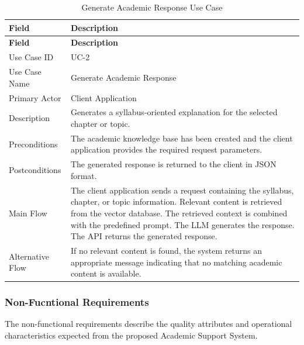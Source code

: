 \begin{xltabular}{\textwidth}{|l|X|}
    \caption{Generate Academic Response Use Case} \\
        \hline
        \textbf{Field} & \textbf{Description} \\
        \hline
        \endfirsthead

        \hline
        \textbf{Field} & \textbf{Description} \\
        \hline
        \endhead

        Use Case ID & UC-2 \\
        \hline
        Use Case Name & Generate Academic Response \\
        \hline
        Primary Actor & Client Application \\
        \hline
        Description & Generates a syllabus-oriented explanation for the selected chapter or topic.\\
        \hline
        Preconditions & The academic knowledge base has been created and the client application provides the required request parameters. \\
        \hline
        Postconditions & The generated response is returned to the client in JSON format. \\
        \hline
        Main Flow &
                The client application sends a request containing the syllabus, chapter, or topic information.\newline
                Relevant content is retrieved from the vector database.\newline
                The retrieved context is combined with the predefined prompt.\newline
                The LLM generates the response.\newline
                The API returns the generated response.
            \\
        \hline
        Alternative Flow & If no relevant content is found, the system returns an appropriate message indicating that no matching academic content is available. \\
        \hline
\end{xltabular}

\subsubsection{Non-Fucntional Requirements}

The non-functional requirements describe the quality attributes and operational characteristics expected from the proposed Academic Support System. \par

